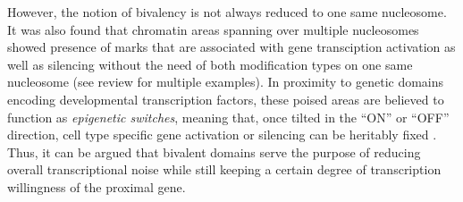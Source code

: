         However, the notion of bivalency is not always reduced to one same nucleosome. It was also found that chromatin areas spanning over multiple nucleosomes showed presence of marks that are associated with gene transciption activation as well as silencing without the need of both modification types on one same nucleosome (see review \cite{Hoffmann2015BivalencyReview} for multiple examples). In proximity to genetic domains encoding developmental transcription factors, these poised areas are believed to function as \textit{epigenetic switches}, meaning that, once tilted in the “ON” or “OFF” direction, cell type specific gene activation or silencing can be heritably fixed \cite{Hoffmann2015BivalencyReview}. Thus, it can be argued that bivalent domains serve the purpose of reducing overall transcriptional noise \cite{Bernstein2006BivalentESC} while still keeping a certain degree of transcription willingness of the proximal gene.
%
%